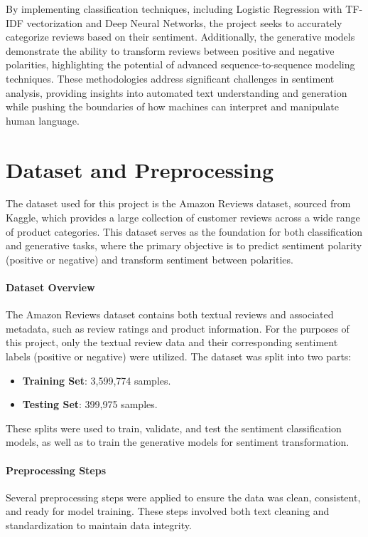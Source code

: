 \documentclass{article}
\begin{document}
By implementing classification techniques, including Logistic Regression with TF-IDF vectorization and Deep Neural Networks, the project seeks to accurately categorize reviews based on their sentiment. Additionally, the generative models demonstrate the ability to transform reviews between positive and negative polarities, highlighting the potential of advanced sequence-to-sequence modeling techniques. These methodologies address significant challenges in sentiment analysis, providing insights into automated text understanding and generation while pushing the boundaries of how machines can interpret and manipulate human language.

\section*{Dataset and Preprocessing}

The dataset used for this project is the Amazon Reviews dataset, sourced from Kaggle, which provides a large collection of customer reviews across a wide range of product categories. This dataset serves as the foundation for both classification and generative tasks, where the primary objective is to predict sentiment polarity (positive or negative) and transform sentiment between polarities. 

\paragraph{Dataset Overview}
The Amazon Reviews dataset contains both textual reviews and associated metadata, such as review ratings and product information. For the purposes of this project, only the textual review data and their corresponding sentiment labels (positive or negative) were utilized. The dataset was split into two parts:
\begin{itemize}
    \item \textbf{Training Set}: 3,599,774 samples.
    \item \textbf{Testing Set}: 399,975 samples.
\end{itemize}
These splits were used to train, validate, and test the sentiment classification models, as well as to train the generative models for sentiment transformation.

\paragraph{Preprocessing Steps}
Several preprocessing steps were applied to ensure the data was clean, consistent, and ready for model training. These steps involved both text cleaning and standardization to maintain data integrity.
\end{document}
